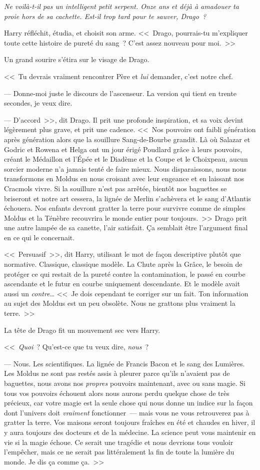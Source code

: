 \emph{Ne voilà-t-il pas un intelligent petit serpent. Onze ans et déjà à amadouer ta proie hors de sa cachette. Est-il trop tard pour te sauver, Drago~?}

Harry réfléchit, étudia, et choisit son arme. <<~Drago, pourrais-tu m'expliquer toute cette histoire de pureté du sang~? C'est assez nouveau pour moi.~>>

Un grand sourire s'étira sur le visage de Drago.

<<~Tu devrais vraiment rencontrer Père et \emph{lui} demander, c'est notre chef.

--- Donne-moi juste le discours de l'ascenseur. La version qui tient en trente secondes, je veux dire.

--- D'accord~>>, dit Drago. Il prit une profonde inspiration, et sa voix devint légèrement plus grave, et prit une cadence. <<~Nos pouvoirs ont faibli génération après génération alors que la souillure Sang-de-Bourbe grandit. Là où Salazar et Godric et Rowena et Helga ont un jour érigé Poudlard grâce à leurs pouvoirs, créant le Médaillon et l'Épée et le Diadème et la Coupe et le Choixpeau, aucun sorcier moderne n'a jamais tenté de faire mieux. Nous disparaissons, nous nous transformons en Moldus en nous croisant avec leur engeance et en laissant nos Cracmols vivre. Si la souillure n'est pas arrêtée, bientôt nos baguettes se briseront et notre art cessera, la lignée de Merlin s'achèvera et le sang d'Atlantis échouera. Nos enfants devront gratter la terre pour survivre comme de simples Moldus et la Ténèbre recouvrira le monde entier pour toujours.~>> Drago prit une autre lampée de sa canette, l'air satisfait. Ça semblait être l'argument final en ce qui le concernait.

<<~Persuasif~>>, dit Harry, utilisant le mot de façon descriptive plutôt que normative. Classique, classique modèle. La Chute après la Grâce, le besoin de protéger ce qui restait de la pureté contre la contamination, le passé en courbe ascendante et le futur en courbe uniquement descendante. Et le modèle avait aussi un \emph{contre}… <<~Je dois cependant te corriger sur un fait. Ton information au sujet des Moldus est un peu obsolète. Nous ne grattons plus vraiment la terre.~>>

La tête de Drago fit un mouvement sec vers Harry.

<<~\emph{Quoi}~? Qu'est-ce que tu veux dire, \emph{nous}~?

--- Nous. Les scientifiques. La lignée de Francis Bacon et le sang des Lumières. Les Moldus ne sont pas restés assis à pleurer parce qu'ils n'avaient pas de baguettes, nous avons nos \emph{propres} pouvoirs maintenant, avec ou sans magie. Si tous vos pouvoirs échouent alors nous aurons perdu quelque chose de très précieux, car votre magie est la seule chose qui nous donne un indice sur la façon dont l'univers doit \emph{vraiment} fonctionner~— mais vous ne vous retrouverez pas à gratter la terre. Vos maisons seront toujours fraîches en été et chaudes en hiver, il y aura toujours des docteurs et de la médecine. La science peut vous maintenir en vie si la magie échoue. Ce serait une tragédie et nous devrions tous vouloir l'empêcher, mais ce ne serait pas littéralement la fin de toute la lumière du monde. Je dis ça comme ça.~>>

